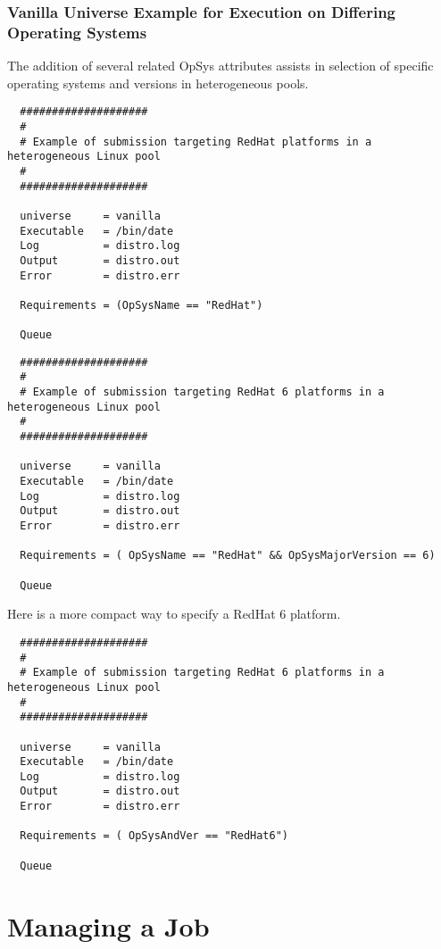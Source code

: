 \subsubsection{Vanilla Universe Example for Execution on Differing Operating Systems} 

The addition of several related OpSys attributes assists in selection of specific operating systems and versions in heterogeneous pools.


\begin{verbatim}
  ####################
  #
  # Example of submission targeting RedHat platforms in a heterogeneous Linux pool
  #
  ####################

  universe     = vanilla
  Executable   = /bin/date
  Log          = distro.log
  Output       = distro.out
  Error        = distro.err

  Requirements = (OpSysName == "RedHat")

  Queue
\end{verbatim}


\begin{verbatim}
  ####################
  #
  # Example of submission targeting RedHat 6 platforms in a heterogeneous Linux pool
  #
  ####################

  universe     = vanilla
  Executable   = /bin/date
  Log          = distro.log
  Output       = distro.out
  Error        = distro.err

  Requirements = ( OpSysName == "RedHat" && OpSysMajorVersion == 6)

  Queue
\end{verbatim}


Here is a more compact way to specify a RedHat 6 platform.

\begin{verbatim}
  ####################
  #
  # Example of submission targeting RedHat 6 platforms in a heterogeneous Linux pool
  #
  ####################

  universe     = vanilla
  Executable   = /bin/date
  Log          = distro.log
  Output       = distro.out
  Error        = distro.err

  Requirements = ( OpSysAndVer == "RedHat6")

  Queue
\end{verbatim}


\section{Managing a Job}


